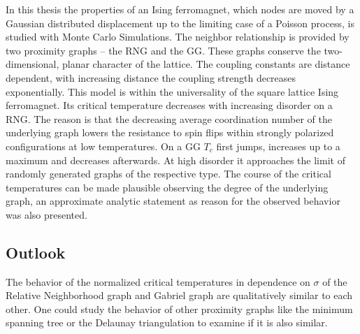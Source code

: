 In this thesis the properties of an Ising ferromagnet, which nodes are
moved by a Gaussian distributed displacement up to the limiting case of
a Poisson process, is studied with Monte Carlo
Simulations. The neighbor relationship is provided by two proximity graphs
-- the RNG and the GG. These graphs conserve the two-dimensional, planar
character of the lattice. The coupling constants
are distance dependent, with increasing distance the coupling strength
decreases exponentially.
This model is within the universality of the square lattice Ising
ferromagnet. Its critical temperature decreases with increasing disorder
on a RNG. The reason is that the decreasing average coordination number
of the underlying graph lowers the resistance to spin flips within
strongly polarized configurations at low temperatures.
On a GG \(T_c\) first jumps, increases up to a maximum and decreases
afterwards. At high disorder it approaches the limit of randomly generated
graphs of the respective type. The course of the critical temperatures
can be made plausible observing the degree of the underlying graph, an
approximate analytic statement as reason for the observed behavior was
also presented.

\subsection{Outlook}
    The behavior of the normalized critical temperatures in dependence
    on \(\sigma\) of the Relative Neighborhood graph and Gabriel graph
    are qualitatively similar to each other. One could study the behavior
    of other proximity graphs like the minimum spanning tree or the
    Delaunay triangulation to examine if it is also similar.\\
